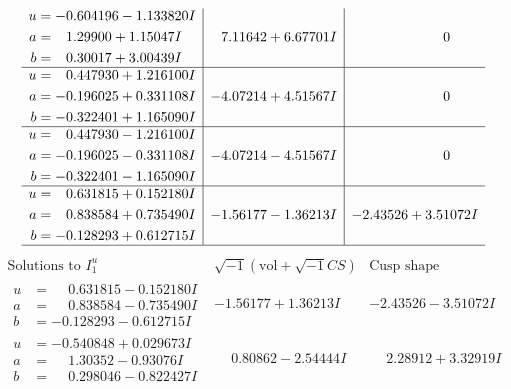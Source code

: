 \documentclass[1p]{elsarticle_modified}
\theoremstyle{definition}
\newcommand{\I}{\sqrt{-1}}
\begin{document}
$$\begin{array}{c|c|c}
\begin{aligned}
u &= -0.604196 - 1.133820 I \\
a &= \phantom{-}1.29900 + 1.15047 I \\
b &= \phantom{-}0.30017 + 3.00439 I\end{aligned}
 & \phantom{-}7.11642 + 6.67701 I & \phantom{-0.000000 } 0 \\ \hline\begin{aligned}
u &= \phantom{-}0.447930 + 1.216100 I \\
a &= -0.196025 + 0.331108 I \\
b &= -0.322401 + 1.165090 I\end{aligned}
 & -4.07214 + 4.51567 I & \phantom{-0.000000 } 0 \\ \hline\begin{aligned}
u &= \phantom{-}0.447930 - 1.216100 I \\
a &= -0.196025 - 0.331108 I \\
b &= -0.322401 - 1.165090 I\end{aligned}
 & -4.07214 - 4.51567 I & \phantom{-0.000000 } 0 \\ \hline\begin{aligned}
u &= \phantom{-}0.631815 + 0.152180 I \\
a &= \phantom{-}0.838584 + 0.735490 I \\
b &= -0.128293 + 0.612715 I\end{aligned}
 & -1.56177 - 1.36213 I & -2.43526 + 3.51072 I\\
 \hline 
 \end{array}$$\newpage$$\begin{array}{c|c|c}  
\text{Solutions to }I^u_{1}& \I (\text{vol} + \sqrt{-1}CS) & \text{Cusp shape}\\
 \hline 
\begin{aligned}
u &= \phantom{-}0.631815 - 0.152180 I \\
a &= \phantom{-}0.838584 - 0.735490 I \\
b &= -0.128293 - 0.612715 I\end{aligned}
 & -1.56177 + 1.36213 I & -2.43526 - 3.51072 I \\ \hline\begin{aligned}
u &= -0.540848 + 0.029673 I \\
a &= \phantom{-}1.30352 - 0.93076 I \\
b &= \phantom{-}0.298046 - 0.822427 I\end{aligned}
 & \phantom{-}0.80862 - 2.54444 I & \phantom{-}2.28912 + 3.32919 I \\ \hline\begin{aligned}

\end{aligned}
\end{array}$$
\end{document}
